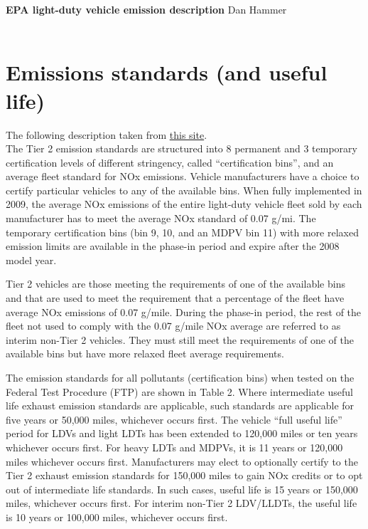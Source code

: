 \documentclass{article}
\title{}
\author{}
\date{\today}
\begin{document}
\setlength{\parindent}{0in}
\renewcommand{\X}{{\bf X}}
\renewcommand{\uab}{\bar{U}_A}
\renewcommand{\ubb}{\bar{U}_B}
\renewcommand{\xao}{X_{A1}}
\renewcommand{\xat}{X_{A2}}
\renewcommand{\xbo}{X_{B1}}
\renewcommand{\xbt}{X_{B2}}
\renewcommand{\L}{\mathscr{L}}
\renewcommand{\st}{\hspace{8pt} \mbox{s.t.} \hspace{6pt}}
\renewcommand{\y}{{\bf y}}

\textbf{EPA light-duty vehicle emission description} \hfill
Dan Hammer \\ \\

\section*{Emissions standards (and useful life)}
\label{sec-1}


The following description taken from \href{http://www.dieselnet.com/standards/us/ld_t2.php}{this site}. \\

The Tier 2 emission standards are structured into 8 permanent and 3
temporary certification levels of different stringency, called
“certification bins”, and an average fleet standard for NOx
emissions. Vehicle manufacturers have a choice to certify particular
vehicles to any of the available bins. When fully implemented in 2009,
the average NOx emissions of the entire light-duty vehicle fleet sold
by each manufacturer has to meet the average NOx standard of 0.07
g/mi. The temporary certification bins (bin 9, 10, and an MDPV bin 11)
with more relaxed emission limits are available in the phase-in period
and expire after the 2008 model year.

Tier 2 vehicles are those meeting the requirements of one of the
available bins and that are used to meet the requirement that a
percentage of the fleet have average NOx emissions of 0.07
g/mile. During the phase-in period, the rest of the fleet not used to
comply with the 0.07 g/mile NOx average are referred to as interim
non-Tier 2 vehicles. They must still meet the requirements of one of
the available bins but have more relaxed fleet average requirements.

The emission standards for all pollutants (certification bins) when
tested on the Federal Test Procedure (FTP) are shown in Table 2. Where
intermediate useful life exhaust emission standards are applicable,
such standards are applicable for five years or 50,000 miles,
whichever occurs first. The vehicle “full useful life” period for LDVs
and light LDTs has been extended to 120,000 miles or ten years
whichever occurs first. For heavy LDTs and MDPVs, it is 11 years or
120,000 miles whichever occurs first. Manufacturers may elect to
optionally certify to the Tier 2 exhaust emission standards for
150,000 miles to gain NOx credits or to opt out of intermediate life
standards. In such cases, useful life is 15 years or 150,000 miles,
whichever occurs first. For interim non-Tier 2 LDV/LLDTs, the useful
life is 10 years or 100,000 miles, whichever occurs first.
\end{document}
